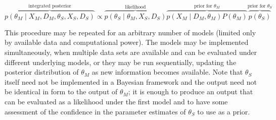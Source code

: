 \documentclass[11pt]{article}
\begin{document}
\begin{equation}
\label{eq:integrated2}
	\overbrace{p( \theta_M \mid X_M, D_M, \theta_S, X_S, D_S )}^\text{integrated posterior}
	\propto 
	\overbrace{p( \theta_S \mid \theta_M, X_S, D_S )}^\text{likelihood}
	\overbrace{p( X_M \mid D_M, \theta_M ) P( \theta_M )}^{\text{prior for } \theta_M}
	\overbrace{p(\theta_S)}^{\text{prior for } \theta_S}
\end{equation}

This procedure may be repeated for an arbitrary number of models (limited only by available data and computational power). 
The models may be implemented simultaneously, when multiple data sets are available and can be evaluated under different underlying models, or they may be run sequentially, updating the posterior distribution of $\theta_M$ as new information becomes available. 
Note that $\theta_S$ itself need not be implemented in a Bayesian framework and the output need not be identical in form to the output of \(\theta_M\); it is enough to produce an output that can be evaluated as a likelihood under the first model and to have some assessment of the confidence in the parameter estimates of $\theta_S$ to use as a prior.

\end{document}
